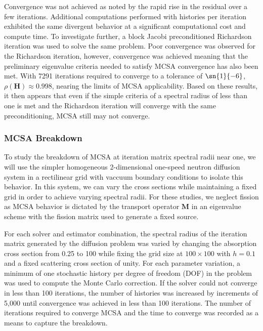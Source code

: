 \documentclass[letterpaper,12pt]{article}
\begin{document}
Convergence was not achieved as noted by the rapid rise in the
residual over a few iterations. Additional computations performed with
 histories per iteration exhibited the same divergent
behavior at a significant computational cost and compute time. To
investigate further, a block Jacobi preconditioned Richardson
iteration was used to solve the same problem. Poor convergence was
observed for the Richardson iteration, however, convergence was
achieved meaning that the preliminary eigenvalue criteria needed to
satisfy MCSA convergence has also been met. With 7291 iterations
required to converge to a tolerance of $\sn{1}{-6}$, $\rho(\mathbf{H})
\approx 0.998$, nearing the limits of MCSA applicability. Based on
these results, it then appears that even if the simple criteria of a
spectral radius of less than one is met and the Richardson iteration
will converge with the same preconditioning, MCSA still may not
converge.

\subsubsection{MCSA Breakdown}
\label{subsubsec:mcsa_break_down}
To study the breakdown of MCSA at iteration matrix spectral radii near
one, we will use the simpler homogeneous 2-dimensional one-speed
neutron diffusion system in a rectilinear grid with vaccuum boundary
conditions to isolate this behavior. In this system, we can vary the
cross sections while maintaining a fixed grid in order to achieve
varying spectral radii. For these studies, we neglect fission as MCSA
behavior is dictated by the transport operator $\mathbf{M}$ in an
eigenvalue scheme with the fission matrix used to generate a fixed
source.

For each solver and estimator combination, the spectral radius of the
iteration matrix generated by the diffusion problem was varied by
changing the absorption cross section from 0.25 to 100 while fixing
the grid size at $100 \times 100$ with $h = 0.1$ and a fixed
scattering cross section of unity. For each parameter variation, a
minimum of one stochastic history per degree of freedom (DOF) in the
problem was used to compute the Monte Carlo correction. If the solver
could not converge in less than 100 iterations, the number of
histories was increased by increments of 5,000 until convergence was
achieved in less than 100 iterations. The number of iterations
required to converge MCSA and the time to converge was recorded as a
means to capture the breakdown.
\end{document}
